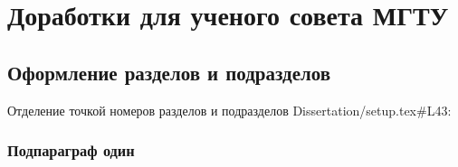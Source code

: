 \chapter{Доработки для ученого совета МГТУ}\label{ch:ch4}

\section{Оформление разделов и подразделов}\label{sec:ch4/sect1}

Отделение точкой номеров разделов и подразделов
Dissertation/setup.tex#L43:



\subsection{Подпараграф \cyrdash{} один}\label{subsec:ch4/sect4/sub1}



\clearpage
